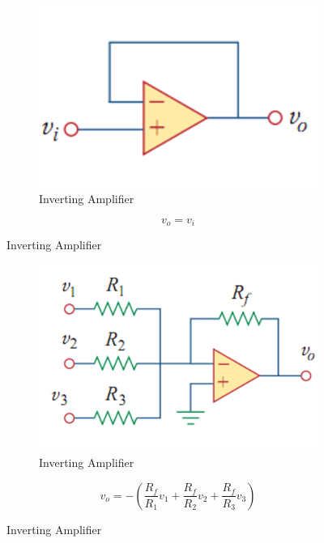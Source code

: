 \documentclass[a4paper,11pt,UTF8]{article}
\begin{document}
\begin{figure}[H]
	\begin{minipage}{.69\textwidth}
		\begin{figure}[H] 
			\centering 
			\includegraphics[scale=0.5]{./img/9.3.png}
			\caption{Inverting Amplifier}
		\end{figure}
	\end{minipage}
	\begin{minipage}{.29\textwidth}
		\LARGE{$$
			v_o=v_i
			$$}
	\end{minipage}
\end{figure}

\begin{figure}[H]
	\begin{minipage}{.69\textwidth}
		\begin{figure}[H] 
			\centering 
			\includegraphics[scale=0.5]{./img/9.4.png}
			\caption{Inverting Amplifier}
		\end{figure}
	\end{minipage}
	\begin{minipage}{.29\textwidth}
		\LARGE{$$
			v_o=-(\frac{R_f}{R_1}v_1+\frac{R_f}{R_2}v_2+\frac{R_f}{R_3}v_3)
			$$}
	\end{minipage}
\end{figure}
\end{document}

